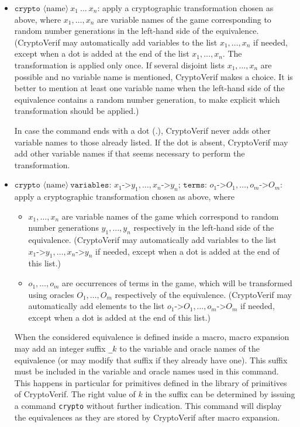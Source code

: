 \documentclass{article}
\newcommand{\nonterm}[1]{\langle\textrm{#1}\rangle}
\begin{document}
\begin{itemize}
\begin{itemize}
\item $\texttt{crypto }\nonterm{name}\ x_1\ \ldots\ x_n$: apply a cryptographic
transformation chosen as above, where $x_1, \ldots, x_n$ are variable
names of the game corresponding to random number generations 
in the left-hand side of the
equivalence. (CryptoVerif may automatically add variables to the list
$x_1, \ldots, x_n$ if needed, except when a dot is added at the end of
the list $x_1, \ldots, x_n$. The transformation is applied only once.
If several disjoint lists $x_1, \ldots, x_n$ are possible and no variable
name is mentioned, CryptoVerif makes a choice. It is better to mention
at least one variable name when the left-hand side of the equivalence
contains a random number generation, to make explicit which transformation 
should be applied.)

In case the command ends with a dot ($\texttt{.}$), CryptoVerif never adds 
other variable names to those already listed. If the dot is absent,
CryptoVerif may add other variable names if that seems necessary to perform
the transformation.

\item $\texttt{crypto }\nonterm{name}\ 
\texttt{variables: }x_1\texttt{->}y_1,\ldots, x_n\texttt{->}y_n
\texttt{; terms: }o_1\texttt{->}O_1,\ldots,o_m\texttt{->}O_m$:
apply a cryptographic transformation chosen as above, where
\begin{itemize}

\item $x_1, \ldots, x_n$ are variable names of the game which
  correspond to random number generations $y_1, \ldots, y_n$
  respectively in the left-hand side of the equivalence. (CryptoVerif
  may automatically add variables to the list
  $x_1\texttt{->}y_1,\ldots, x_n\texttt{->}y_n$ if needed, except when
  a dot is added at the end of this list.)

\item $o_1, \ldots, o_m$ are occurrences of terms in the game, which
  will be transformed using oracles $O_1, \ldots, O_m$ respectively of
  the equivalence. (CryptoVerif may automatically add elements to the
  list $o_1\texttt{->}O_1,\ldots,o_m\texttt{->}O_m$ if needed, except
  when a dot is added at the end of this list.)

\end{itemize}
When the considered equivalence is defined inside a macro,
macro expansion may add an integer suffix \texttt{\_$k$} to the variable
and oracle names of the equivalence (or may modify that suffix if
they already have one). This suffix must be included in
the variable and oracle names used in this command.
This happens in particular for primitives defined in the
library of primitives of CryptoVerif. The right value of $k$ in the
suffix can be determined by issuing a command \texttt{crypto} without
further indication. This command will display the equivalences
as they are stored by CryptoVerif after macro expansion.


\end{itemize}
\end{itemize}
\end{document}
